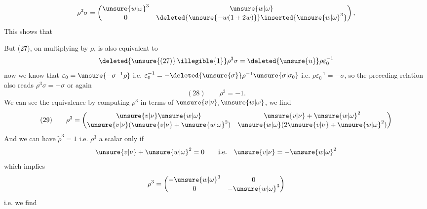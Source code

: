 

\[
\rho^2\sigma=\begin{pmatrix}\unsure{w|\omega}^3&\unsure{w|\omega}\\0&\deleted{\unsure{-w(1+2w)}}\inserted{\unsure{w|\omega}^3}\end{pmatrix},
\]
This shows that
\inserted{
\[
(27\mathrm{bis})\qquad
\rho^2\sigma=\varepsilon_0^{-1}\Longleftrightarrow
\left\{\unsure{v|\nu}+\unsure{w|\omega}^2=0,\ \unsure{w|\omega}^3=1\right.
\quad
\left(\Rightarrow \unsure{v|\nu}=-\unsure{w|\omega}^2=-1/\unsure{w|\omega}\ \text{i.e.}\ \unsure{w|\omega}=-1/\unsure{v|\nu},\ \mathrm{OK}\right)
\]
}

But (27), on multiplying by $\rho$, is also equivalent to
\[\deleted{\unsure{(27)}\,\illegible{1}}\rho^3\sigma=\deleted{\unsure{u}}\rho\varepsilon_0^{-1}
\]
now we know that $\varepsilon_0=\unsure{-\sigma^{-1}\rho}$  i.e. $\varepsilon_0^{-1}=-\deleted{\unsure{\sigma}}\rho^{-1}\unsure{\sigma|\sigma_0}$
i.e. $\rho\varepsilon_0^{-1}=-\sigma$, so the preceding relation also reads $\rho^3\sigma=-\sigma$ or again
\[
(28)\qquad \boxed{\rho^3=-1}.
\]
We can see  the equivalence  by computing $\rho^3$ in terms of $\unsure{v|\nu},\unsure{w|\omega}$, we find
\[
(29)\qquad
\rho^3=\begin{pmatrix}\unsure{v|\nu}\unsure{w|\omega}&\unsure{v|\nu}+\unsure{w|\omega}^2\\\unsure{v|\nu}(\unsure{v|\nu}+\unsure{w|\omega}^2)&\unsure{w|\omega}(2\unsure{v|\nu}+\unsure{w|\omega}^2)\end{pmatrix}
\]
And we can have $\widetilde\rho^3=1$ i.e. $\rho^3$ a scalar only if 
\[
\unsure{v|\nu}+\unsure{w|\omega}^2=0\qquad\text{i.e.}\quad \unsure{v|\nu}=-\unsure{w|\omega}^2
\]
which implies
\[
\rho^3=\begin{pmatrix}-\unsure{w|\omega}^3&0\\0&-\unsure{w|\omega}^3\end{pmatrix}
\]
i.e. we find

